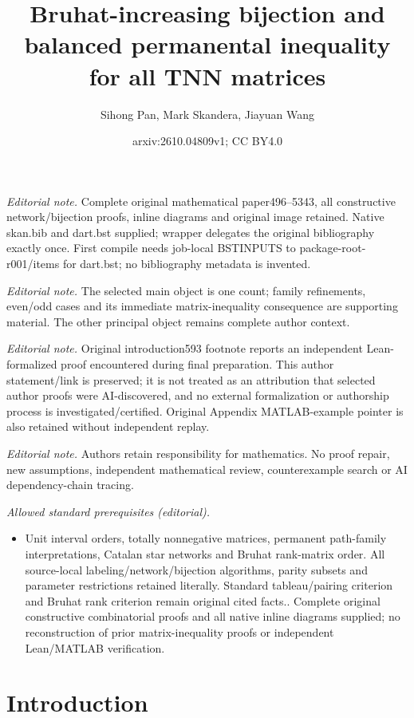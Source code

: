\documentclass[12pt]{amsart}
\title{Bruhat-increasing bijection and balanced permanental inequality for all TNN matrices}
\author{Sihong Pan, Mark Skandera, Jiayuan Wang}
\date{arxiv:2610.04809v1; CC BY4.0}
\theoremstyle{definition}
\numberwithin{equation}{section}
\begin{document}
\maketitle
\noindent\textit{Editorial note.} Complete original mathematical paper496--5343, all constructive network/bijection proofs, inline diagrams and original image retained. Native skan.bib and dart.bst supplied; wrapper delegates the original bibliography exactly once. First compile needs job-local BSTINPUTS to package-root-r001/items for dart.bst; no bibliography metadata is invented.\par\medskip
\noindent\textit{Editorial note.} The selected main object is one count; family refinements, even/odd cases and its immediate matrix-inequality consequence are supporting material. The other principal object remains complete author context.\par\medskip
\noindent\textit{Editorial note.} Original introduction593 footnote reports an independent Lean-formalized proof encountered during final preparation. This author statement/link is preserved; it is not treated as an attribution that selected author proofs were AI-discovered, and no external formalization or authorship process is investigated/certified. Original Appendix MATLAB-example pointer is also retained without independent replay.\par\medskip
\noindent\textit{Editorial note.} Authors retain responsibility for mathematics. No proof repair, new assumptions, independent mathematical review, counterexample search or AI dependency-chain tracing.\par\medskip
\noindent\textit{Allowed standard prerequisites (editorial).}\begin{itemize}
\item Unit interval orders, totally nonnegative matrices, permanent path-family interpretations, Catalan star networks and Bruhat rank-matrix order. All source-local labeling/network/bijection algorithms, parity subsets and parameter restrictions retained literally. Standard tableau/pairing criterion and Bruhat rank criterion remain original cited facts.. Complete original constructive combinatorial proofs and all native inline diagrams supplied; no reconstruction of prior matrix-inequality proofs or independent Lean/MATLAB verification.
\end{itemize}\medskip
\section{Introduction}\label{s:intro}
\end{document}
